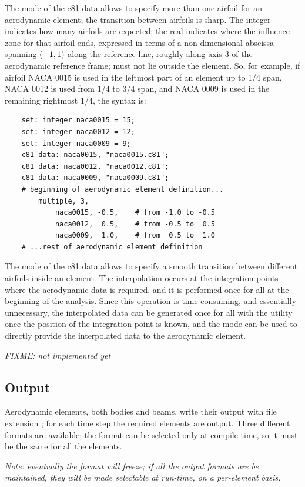 The  mode of the c81 data allows to specify
more than one airfoil for an aerodynamic element; the transition
between airfoils is sharp.
The integer  indicates how many airfoils are expected;
the real  indicates where the influence zone for that
airfoil ends, expressed in terms of a non-dimensional abscissa spanning 
$\left( -1,1 \right)$ along the reference line, roughly along axis 3 
of the aerodynamic reference frame;  must not lie outside
the element.
So, for example, if airfoil NACA 0015 is used in the leftmost part
of an element up to 1/4 span, NACA 0012 is used from 1/4 to 3/4 span,
and NACA 0009 is used in the remaining rightmost 1/4, the syntax is:
\begin{verbatim}
    set: integer naca0015 = 15;
    set: integer naca0012 = 12;
    set: integer naca0009 = 9;
    c81 data: naca0015, "naca0015.c81";
    c81 data: naca0012, "naca0012.c81";
    c81 data: naca0009, "naca0009.c81";
    # beginning of aerodynamic element definition...
        multiple, 3,
            naca0015, -0.5,    # from -1.0 to -0.5
            naca0012,  0.5,    # from -0.5 to  0.5
            naca0009,  1.0,    # from  0.5 to  1.0
    # ...rest of aerodynamic element definition
\end{verbatim}

The  mode of the c81 data allows to specify 
a smooth transition between different airfoils inside an element.
The interpolation occurs at the integration points where the
aerodynamic data is required, and it is performed once for all
at the beginning of the analysis.
Since this operation is time consuming, and essentially unnecessary,
the interpolated data can be generated once for all with the utility
 once the position of the integration point is known,
and the  mode can be used to directly provide
the interpolated data to the aerodynamic element.

\noindent
\emph{FIXME: not implemented yet}


\subsection{Output}
Aerodynamic elements, both bodies and beams, write their output with file
extension ; for each time step the required elements are output.
Three different formats are available; the format can be selected only at
compile time, so it must be the same for all the elements. 

\noindent
\emph{Note: eventually the format will freeze; if all the output formats
are be maintained, they will be made selectable at run-time,
on a per-element basis.}

